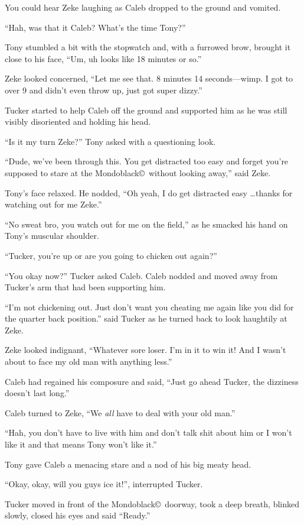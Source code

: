 You could hear Zeke laughing as Caleb dropped to the ground and
vomited.

``Hah, was that it Caleb?  What's the time Tony?''

Tony stumbled a bit with the stopwatch and, with a furrowed
brow, brought it close to his face, ``Um, uh looks like 18
minutes or so.''

Zeke looked concerned, ``Let me see that. 8 minutes 14
seconds---wimp. I got to over 9 and didn't even throw up, just
got super dizzy.''

Tucker started to help Caleb off the ground and supported him as
he was still visibly disoriented and holding his head.

``Is it my turn Zeke?'' Tony asked with a questioning look.

``Dude, we've been through this. You get distracted too easy and
forget you're supposed to stare at the Mondoblack\copyright\
without looking away,'' said Zeke.

Tony's face relaxed. He nodded, ``Oh yeah, I do get
distracted easy \ldots thanks for watching out for me Zeke.''

``No sweat bro, you watch out for me on the field,'' as he
smacked his hand on Tony's muscular shoulder.

``Tucker, you're up or are you going to chicken out again?''

``You okay now?'' Tucker asked Caleb. Caleb nodded and moved
away from Tucker's arm that had been supporting him.

``I'm not chickening out. Just don't want you cheating me again
like you did for the quarter back position.'' said Tucker as he
turned back to look haughtily at Zeke.

Zeke looked indignant, ``Whatever sore loser. I'm in it
to win it! And I wasn't about to face my old man with anything
less.''

Caleb had regained his composure and said, ``Just go ahead
Tucker, the dizziness doesn't last long.''

Caleb turned to Zeke, ``We
\emph{all} have to deal with your old man.''

``Hah, you don't have to live with him and don't
talk shit about him or I won't like it and that means Tony won't
like it.''

Tony gave Caleb a menacing stare and a nod of his big meaty
head.

``Okay, okay, will you guys ice it!'', interrupted Tucker.

Tucker moved in front of the Mondoblack\copyright\ doorway, took a
deep breath, blinked slowly, closed his eyes and said ``Ready.''

